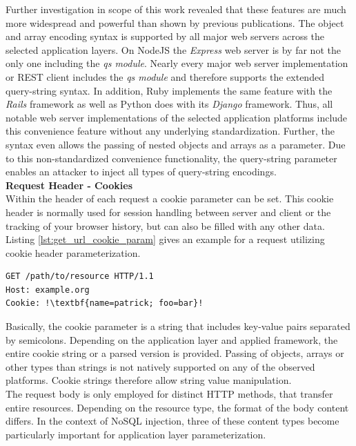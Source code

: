 Further investigation in scope of this work revealed that these features are much more widespread and powerful than shown by previous publications. The object and array encoding syntax is supported by all major web servers across the selected application layers. On NodeJS the \textit{Express} web server is by far not the only one including the \textit{qs module}. Nearly every major web server implementation or REST client includes the \textit{qs module} and therefore supports the extended query-string syntax. In addition, Ruby implements the same feature with the \textit{Rails} framework as well as Python does with its \textit{Django} framework. Thus, all notable web server implementations of the selected application platforms include this convenience feature without any underlying standardization. Further, the syntax even allows the passing of nested objects and arrays as a parameter. Due to this non-standardized convenience functionality, the query-string parameter enables an attacker to inject all types of query-string encodings. \\

\textbf{Request Header - Cookies}\\
Within the header of each request a cookie parameter can be set. This cookie header is normally used for session handling between server and client or the tracking of your browser history, but can also be filled with any other data. Listing \ref{lst:get_url_cookie_param} gives an example for a request utilizing cookie header parameterization. \\

\begin{lstlisting}[escapechar=!, caption={Example for GET request with cookie header parameterization}, label={lst:get_url_cookie_param}]
GET /path/to/resource HTTP/1.1
Host: example.org
Cookie: !\textbf{name=patrick; foo=bar}!
\end{lstlisting}

Basically, the cookie parameter is a string that includes key-value pairs separated by semicolons. Depending on the application layer and applied framework, the entire cookie string or a parsed version is provided. Passing of objects, arrays or other types than strings is not natively supported on any of the observed platforms. Cookie strings therefore allow string value manipulation. \\

The request body is only employed for distinct HTTP methods, that transfer entire resources. Depending on the resource type, the format of the body content differs. In the context of NoSQL injection, three of these content types become particularly important for application layer parameterization. \\

